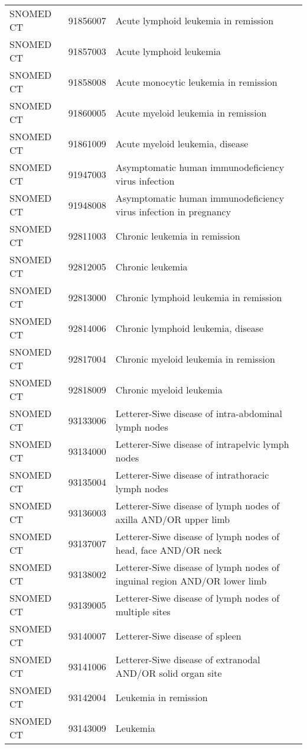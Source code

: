 \begin{table}[ht]
\begin{tabular}{lll}
  SNOMED CT & 91856007 & Acute lymphoid leukemia in remission \\ 
  SNOMED CT & 91857003 & Acute lymphoid leukemia \\ 
  SNOMED CT & 91858008 & Acute monocytic leukemia in remission \\ 
  SNOMED CT & 91860005 & Acute myeloid leukemia in remission \\ 
  SNOMED CT & 91861009 & Acute myeloid leukemia, disease \\ 
  SNOMED CT & 91947003 & Asymptomatic human immunodeficiency virus infection \\ 
  SNOMED CT & 91948008 & Asymptomatic human immunodeficiency virus infection in pregnancy \\ 
  SNOMED CT & 92811003 & Chronic leukemia in remission \\ 
  SNOMED CT & 92812005 & Chronic leukemia \\ 
  SNOMED CT & 92813000 & Chronic lymphoid leukemia in remission \\ 
  SNOMED CT & 92814006 & Chronic lymphoid leukemia, disease \\ 
  SNOMED CT & 92817004 & Chronic myeloid leukemia in remission \\ 
  SNOMED CT & 92818009 & Chronic myeloid leukemia \\ 
  SNOMED CT & 93133006 & Letterer-Siwe disease of intra-abdominal lymph nodes \\ 
  SNOMED CT & 93134000 & Letterer-Siwe disease of intrapelvic lymph nodes \\ 
  SNOMED CT & 93135004 & Letterer-Siwe disease of intrathoracic lymph nodes \\ 
  SNOMED CT & 93136003 & Letterer-Siwe disease of lymph nodes of axilla AND/OR upper limb \\ 
  SNOMED CT & 93137007 & Letterer-Siwe disease of lymph nodes of head, face AND/OR neck \\ 
  SNOMED CT & 93138002 & Letterer-Siwe disease of lymph nodes of inguinal region AND/OR lower limb \\ 
  SNOMED CT & 93139005 & Letterer-Siwe disease of lymph nodes of multiple sites \\ 
  SNOMED CT & 93140007 & Letterer-Siwe disease of spleen \\ 
  SNOMED CT & 93141006 & Letterer-Siwe disease of extranodal AND/OR solid organ site \\ 
  SNOMED CT & 93142004 & Leukemia in remission \\ 
  SNOMED CT & 93143009 & Leukemia \\ 

\end{tabular}
\end{table}
